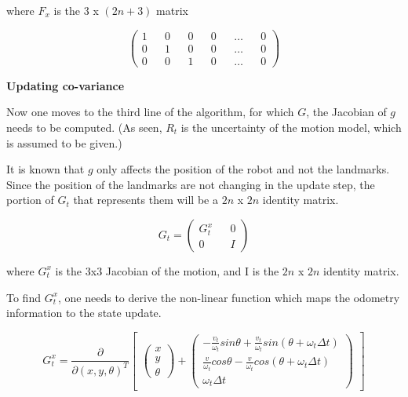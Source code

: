 \documentclass[a4paper]{article}
\begin{document}
where $F_x$ is the $3$ x $(2n+3)$ matrix

\begin{equation*}
    \begin{pmatrix}
        1 && 0 && 0 && 0 && \hdots && 0
        \\
        0 && 1 && 0 && 0 && \hdots && 0
        \\
        0 && 0 && 1 && 0 && \hdots && 0
    \end{pmatrix}
\end{equation*}

\textbf{Updating co-variance}

Now one moves to the third line of the algorithm, for which $G$, the Jacobian of $g$ needs to be computed. (As seen, $R_t$ is the uncertainty of the motion model, which is assumed to be given.)

It is known that $g$ only affects the position of the robot and not the landmarks. Since the position of the landmarks are not changing in the update step, the portion of $G_t$ that represents them will be a $2n$ x $2n$ identity matrix.

\begin{equation*}
    G_t = 
    \begin{pmatrix}
    G_t^x && 0 \\ 0 && I
    \end{pmatrix}
\end{equation*}

where $G_t^x$ is the $3$x$3$ Jacobian of the motion, and I is the $2n$ x $2n$ identity matrix.

To find $G_t^x$, one needs to derive the non-linear function which maps the odometry information to the state update.

\begin{equation*}
    G_t^x = \frac{\partial}{\partial (x, y, \theta)^T}
    \begin{bmatrix}
        \begin{pmatrix}
            x \\ y \\ \theta
        \end{pmatrix}
        +
        \begin{pmatrix}
            - \frac{v_t}{\omega_t} sin\theta + \frac{v_t}{\omega_t} sin (\theta + \omega_t \Delta t)
            \\ \frac{v}{\omega_t} cos\theta - \frac{v}{\omega_t} cos (\theta + \omega_t \Delta t) 
            \\ \omega_t \Delta t
        \end{pmatrix}
    \end{bmatrix}
\end{equation*}
\end{document}
